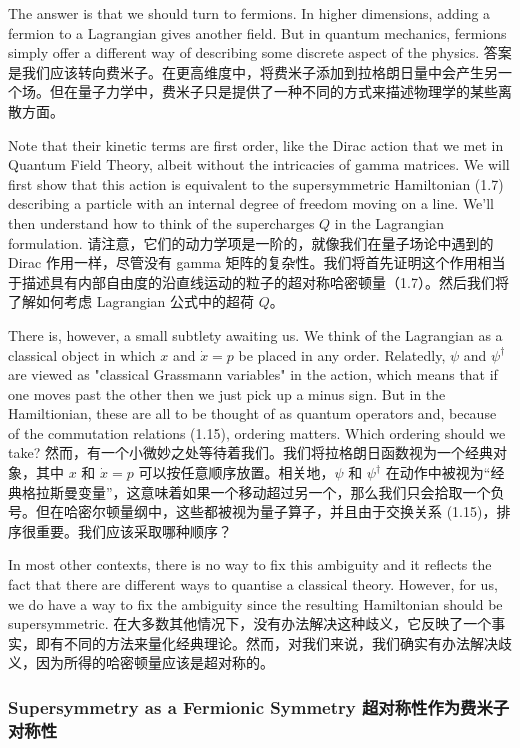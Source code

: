 \documentclass{article}
\newcommand{\SakuraiYukiko}{\emoji{cherry-blossom}\emoji{snowflake}}
\begin{document}
The answer is that we should turn to fermions. In higher dimensions, adding a fermion to a Lagrangian gives another field. But in quantum mechanics, fermions simply offer a different way of describing some discrete aspect of the physics.
答案是我们应该转向费米子。在更高维度中，将费米子添加到拉格朗日量中会产生另一个场。但在量子力学中，费米子只是提供了一种不同的方式来描述物理学的某些离散方面。

Note that their kinetic terms are first order, like the Dirac action that we met in Quantum Field Theory, albeit without the intricacies of gamma matrices. We will first show that this action is equivalent to the supersymmetric Hamiltonian (1.7) describing a particle with an internal degree of freedom moving on a line. We'll then understand how to think of the supercharges $Q$ in the Lagrangian formulation.
请注意，它们的动力学项是一阶的，就像我们在量子场论中遇到的 Dirac 作用一样，尽管没有 gamma 矩阵的复杂性。我们将首先证明这个作用相当于描述具有内部自由度的沿直线运动的粒子的超对称哈密顿量（1.7）。然后我们将了解如何考虑 Lagrangian 公式中的超荷 $Q$。

There is, however, a small subtlety awaiting us. We think of the Lagrangian as a classical object in which $x$ and $\dot{x} = p$ be placed in any order. Relatedly, $\psi$ and $\psi^{\dagger}$ are viewed as "classical Grassmann variables" in the action, which means that if one moves past the other then we just pick up a minus sign. But in the Hamiltionian, these are all to be thought of as quantum operators and, because of the commutation relations (1.15), ordering matters. Which ordering should we take?
然而，有一个小微妙之处等待着我们。我们将拉格朗日函数视为一个经典对象，其中 $x$ 和 $\dot{x} = p$ 可以按任意顺序放置。相关地，$\psi$ 和 $\psi^{\dagger}$ 在动作中被视为“经典格拉斯曼变量”，这意味着如果一个移动超过另一个，那么我们只会拾取一个负号。但在哈密尔顿量纲中，这些都被视为量子算子，并且由于交换关系 (1.15)，排序很重要。我们应该采取哪种顺序？

In most other contexts, there is no way to fix this ambiguity and it reflects the fact that there are different ways to quantise a classical theory. However, for us, we do have a way to fix the ambiguity since the resulting Hamiltonian should be supersymmetric.
在大多数其他情况下，没有办法解决这种歧义，它反映了一个事实，即有不同的方法来量化经典理论。然而，对我们来说，我们确实有办法解决歧义，因为所得的哈密顿量应该是超对称的。

\subsubsection{Supersymmetry as a Fermionic Symmetry \SakuraiYukiko 超对称性作为费米子对称性}
\end{document}
